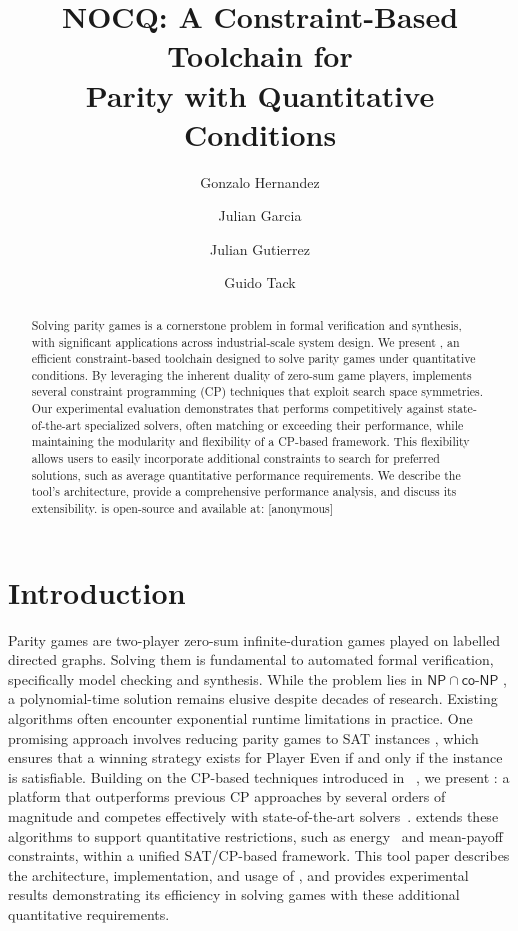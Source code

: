 \documentclass[a4paper,UKenglish,cleveref, autoref, thm-restate]{lipics-v2021}
\title{NOCQ: A Constraint-Based Toolchain for\\Parity with Quantitative Conditions} %
\author{Gonzalo Hernandez}{Monash University \and Universidad de Nariño}{gonzalo.hernandez@monash.edu, gonzalo.hernandez@udenar.edu.co}{}{}
\author{Julian Garcia}{Monash University}{julian.garcia@monash.edu}{}{}
\author{Julian Gutierrez}{University of Sussex}{J.Gutierrez@sussex.ac.uk}{}{}
\author{Guido Tack}{Monash University \and OPTIMA ARC ITTC}{guido.tack@monash.edu}{}{}
\begin{document}
\maketitle

\begin{abstract}
Solving parity games is a cornerstone problem in formal verification and synthesis, with significant applications across industrial-scale system design. We present \nocq, an efficient constraint-based toolchain designed to solve parity games under quantitative conditions. By leveraging the inherent duality of zero-sum game players, \nocq implements several constraint programming (CP) techniques that exploit search space symmetries. Our experimental evaluation demonstrates that \nocq performs competitively against state-of-the-art specialized solvers, often matching or exceeding their performance, while maintaining the modularity and flexibility of a CP-based framework. This flexibility allows users to easily incorporate additional constraints to search for preferred solutions, such as average quantitative performance requirements. We describe the tool's architecture, provide a comprehensive performance analysis, and discuss its extensibility. \nocq is open-source and available at: [anonymous]

\end{abstract}

\section{Introduction}

Parity games are two-player zero-sum infinite-duration games played on labelled directed graphs. Solving them is fundamental to automated formal verification, specifically model checking and synthesis. While the problem lies in $\mathsf{NP} \cap \mathsf{co\textit{-}NP}$ , a polynomial-time solution remains elusive despite decades of research. Existing algorithms often encounter exponential runtime limitations in practice. One promising approach involves reducing parity games to SAT instances , which ensures that a winning strategy exists for Player Even if and only if the instance is satisfiable.  Building on the CP-based techniques introduced in~\cite{Hernandez:2026:noc} , we present \nocq: a platform that outperforms previous CP approaches by several orders of magnitude and competes effectively with state-of-the-art solvers~\cite{vanDijk:2018,Benerecetti:2025,Aggarwal:2023}. \nocq extends these algorithms to support quantitative restrictions, such as energy~\cite{ChatterjeeD12} and mean-payoff~\cite{ChatterjeeHS17} constraints, within a unified SAT/CP-based framework. This tool paper describes the architecture, implementation, and usage of \nocq, and provides experimental results demonstrating its efficiency in solving games with these additional quantitative requirements. 
\end{document}
